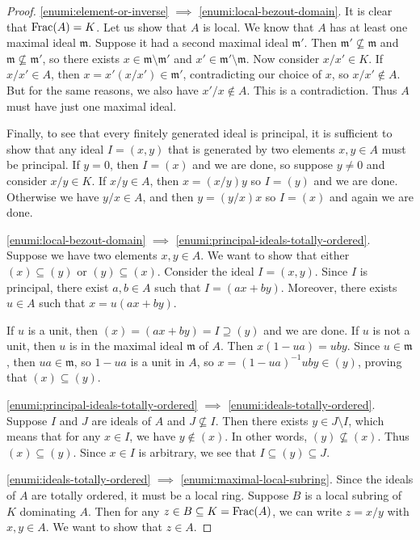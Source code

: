 \begin{proof}
\medskip
\noindent
\ref{enumi:element-or-inverse} $\implies$ \ref{enumi:local-bezout-domain}. It is clear that $\operatorname{Frac}(A) = K$. Let us show that $A$ is local. We know that $A$ has at least one maximal ideal $\mathfrak{m}$. Suppose it had a second maximal ideal $\mathfrak{m}'$. Then $\mathfrak{m}' \not\subseteq \mathfrak{m}$ and $\mathfrak{m} \not\subseteq \mathfrak{m}'$, so there exists $x \in \mathfrak{m} \setminus \mathfrak{m}'$ and $x' \in \mathfrak{m}' \setminus \mathfrak{m}$. Now consider $x/x' \in K$. If $x/x' \in A$, then $x = x'(x/x') \in \mathfrak{m}'$, contradicting our choice of $x$, so $x/x' \notin A$. But for the same reasons, we also have $x'/x \notin A$. This is a contradiction. Thus $A$ must have just one maximal ideal.

Finally, to see that every finitely generated ideal is principal, it is sufficient to show that any ideal $I = (x, y)$ that is generated by two elements $x, y \in A$ must be principal. If $y = 0$, then $I = (x)$ and we are done, so suppose $y \neq 0$ and consider $x/y \in K$. If $x/y \in A$, then $x = (x/y)y$ so $I = (y)$ and we are done. Otherwise we have $y/x \in A$, and then $y = (y/x)x$ so $I = (x)$ and again we are done. 

\medskip
\noindent
\ref{enumi:local-bezout-domain} $\implies$ \ref{enumi:principal-ideals-totally-ordered}. Suppose we have two elements $x, y \in A$. 
We want to show that either $(x) \subseteq (y)$ or $(y) \subseteq (x)$.
Consider the ideal $I = (x, y)$. Since $I$ is principal, there exist $a, b \in A$ such that $I = (ax + by)$. Moreover, there exists $u \in A$ such that $x = u(ax + by)$. 

If $u$ is a unit, then $(x) = (ax + by) = I \supseteq  (y)$ and we are done. If $u$ is not a unit, then $u$ is in the maximal ideal $\mathfrak{m}$ of $A$. Then $x(1-ua) = uby$. Since $u \in \mathfrak{m}$, then $ua \in \mathfrak{m}$, so $1-ua$ is a unit in $A$, so $x = (1-ua)^{-1}uby \in (y)$, proving that $(x) \subseteq (y)$. 

\medskip
\noindent
\ref{enumi:principal-ideals-totally-ordered} $\implies$ \ref{enumi:ideals-totally-ordered}. Suppose $I$ and $J$ are ideals of $A$ and $J \not\subseteq I$. Then there exists $y \in J  \setminus I$, which means that for any $x \in I$, we have $y \notin (x)$. In other words, $(y) \not\subseteq (x)$. Thus $(x) \subseteq (y)$. Since $x \in I$ is arbitrary, we see that $I \subseteq (y) \subseteq J$. 

\medskip
\noindent
\ref{enumi:ideals-totally-ordered} $\implies$ \ref{enumi:maximal-local-subring}. Since the ideals of $A$ are totally ordered, it must be a local ring. Suppose $B$ is a local subring of $K$ dominating $A$. Then for any $z \in B \subseteq K = \operatorname{Frac}(A)$, we can write $z = x/y$ with $x, y \in A$.  We want to show that $z \in A$. 


\end{proof}
